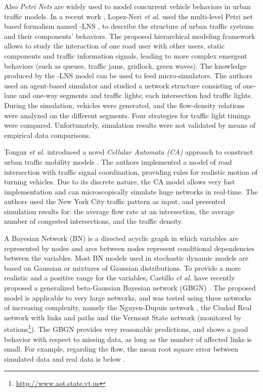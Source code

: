 \documentclass[10pt,onecolumn]{article}
\begin{document}
Also \textit{Petri Nets} are widely used to model concurrent vehicle behaviors in urban traffic models. 
In a recent work \cite{LopezNeri2010}, Lopez-Neri \textit{et al.} used the multi-level Petri net based formalism named -LNS \cite{SanchezHerrera2004}, to describe the structure of urban traffic systems and their components' behaviors. 
The proposed hierarchical modeling framework allows to study the interaction of one road user with other users, static components and traffic information signals, leading to more complex emergent behaviors (such as queues, traffic jams, gridlock, green waves). The knowledge produced by the -LNS model can be used to feed micro-simulators. The authors used an agent-based simulator and studied a network structure consisting of  one-lane and one-way segments and  traffic lights; each intersection had  traffic lights. 
During the simulation,  vehicles were generated, and the flow-density relations were analyzed on the different segments. Four strategies for traffic light timings were compared. Unfortunately, simulation results were not validated by means of empirical data comparisons. 

Tonguz \textit{et al.} introduced a novel \textit{Cellular Automata (CA)} approach to construct urban traffic mobility models \cite{Tonguz2009}. The authors implemented a model of road intersection with traffic signal coordination, providing rules for realistic motion of turning vehicles. Due to its discrete nature, the CA model allows very fast implementation and can microscopically simulate huge networks in real-time. The authors used the New York City traffic pattern as input, and presented simulation results for: the average flow rate at an intersection, the average number of congested intersections, and the traffic density.

A Bayesian Network (BN) is a directed acyclic graph in which variables are represented by nodes and arcs between nodes represent conditional dependencies between the variables.
Most BN models used in stochastic dynamic models are based on Gaussian or mixtures of Gaussian distributions. To provide a more realistic and a positive range for the variables, Castillo \textit{et al.} have recently proposed a generalized beta-Gaussian Bayesian network (GBGN) \cite{Castillo2012}. 
The proposed model is applicable to very large networks, and was tested using three networks of increasing complexity, namely the Nguyen-Dupuis network \cite{Nguyen1984}, the Ciudad Real network with  links and  paths and the Vermont State network (monitored by  stations\footnote{\url{http://www.aot.state.vt.us}}). 
The GBGN provides very reasonable predictions, and shows a good behavior with respect to missing data, as long as the number of affected links is small. For example, regarding the flow, the mean root square error between simulated data and real data is below .
\end{document}
